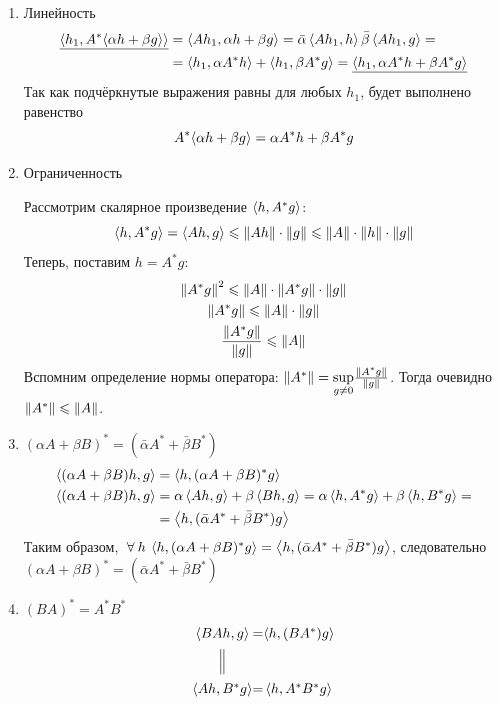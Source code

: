 \documentclass[12pt]{article}
\begin{document}
			\begin{enumerate}
				\item Линейность
				\begin{align*}
					\underline{ \left\langle h_1, A^{*}\langle \alpha h + \beta g \rangle \right\rangle } &= \left\langle Ah_1, \alpha h + \beta g \right\rangle = 
					\bar{\alpha}\left\langle Ah_1, h \right\rangle \bar{\beta}\left\langle Ah_1, g \right\rangle = \\
					&= \left\langle h_1, \alpha A^{*} h \right\rangle + \left\langle h_1, \beta A^{*} g \right\rangle = 
					\underline{ \left\langle h_1, \alpha A^{*} h + \beta A^{*} g \right\rangle }
				\end{align*}
				Так как подчёркнутые выражения равны для любых $h_1$, будет выполнено равенство
				$$A^{*}\langle \alpha h + \beta g \rangle = \alpha A^{*} h + \beta A^{*} g$$
		
				\item Ограниченность \label{bounded}
		
				Рассмотрим скалярное произведение $\left\langle h, A^{*}g \right\rangle$: 
				$$\left\langle h, A^{*}g \right\rangle = \left\langle Ah, g \right\rangle \leqslant \left\| Ah \right\|\cdot\left\| g \right\| \leqslant \left\| A \right\|\cdot\left\| h \right\|\cdot\left\| g \right\|$$
				Теперь, поставим $h = A^{*}g$:
				\begin{gather*}
					\left\| A^{*}g \right\|^2 \leqslant \left\| A \right\|\cdot\left\| A^{*}g \right\|\cdot\left\| g \right\| \\
					\left\| A^{*}g \right\| \leqslant \left\| A \right\|\cdot\left\| g \right\| \\
					\dfrac{\left\| A^{*}g \right\|}{\left\| g \right\|} \leqslant \left\| A \right\|
				\end{gather*}
				Вспомним определение нормы оператора: $\left\| A^{*} \right\| = \underset{g \neq 0}{\sup} \frac{\left\| A^{*}g \right\|}{\left\| g \right\|}$. Тогда очевидно
				$\left\| A^{*} \right\| \leqslant \left\| A \right\|$.
		
				\item $(\alpha A + \beta B)^{*} = (\bar{\alpha}A^{*} + \bar{\beta}B^{*})$ \label{conjlin}
				\begin{align*}
					\left\langle (\alpha A + \beta B)h, g \right\rangle &= \left\langle h, (\alpha A + \beta B)^{*}g \right\rangle \\
					\left\langle (\alpha A + \beta B)h, g \right\rangle &= \alpha\left\langle Ah, g \right\rangle + \beta\left\langle Bh, g \right\rangle 
					= \alpha\left\langle h, A^{*}g \right\rangle + \beta \left\langle h, B^{*}g \right\rangle = \\
					&= \left\langle h, (\bar{\alpha}A^{*} + \bar{\beta}B^{*})g \right\rangle
				\end{align*}
				Таким образом, $\forall h\: \scal{h}{(\alpha A + \beta B)^{*}g} = \scal{h}{(\bar{\alpha}A^{*} + \bar{\beta}B^{*})g}$, 
				следовательно $(\alpha A + \beta B)^{*} = (\bar{\alpha}A^{*} + \bar{\beta}B^{*})$ \\
		
				\item $(BA)^{*} = A^{*}B^{*}$
				$$
				\begin{CD}
					\scal{BAh}{g} @. = @. \scal{h}{(BA^{*})g} \\
						@| \\
					\scal{Ah}{B^{*}g} @. = @. \scal{h}{A^{*}B^{*}g}
				\end{CD}
				$$
		

\end{enumerate}
\end{document}
